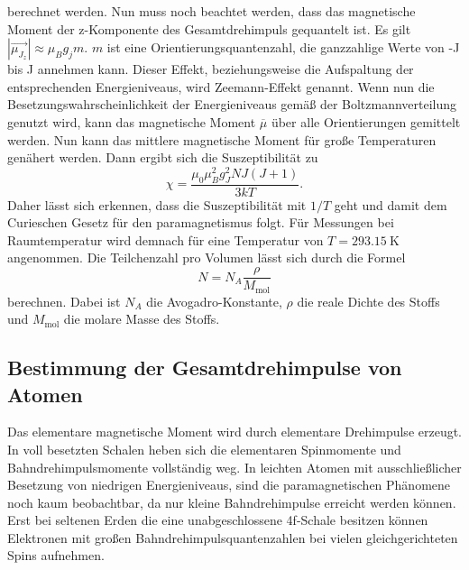 berechnet werden.
Nun muss noch beachtet werden, dass das magnetische Moment der z-Komponente des Gesamtdrehimpuls gequantelt ist.
Es gilt $\left|\vec{\mu_{J_z}}\right| \approx \mu_B g_j m$. $m$ ist eine Orientierungsquantenzahl, die ganzzahlige Werte von -J bis J
annehmen kann. Dieser Effekt, beziehungsweise die Aufspaltung der entsprechenden Energieniveaus, wird Zeemann-Effekt genannt.
Wenn nun die Besetzungswahrscheinlichkeit der Energieniveaus gemäß der Boltzmannverteilung genutzt wird, kann das magnetische Moment $\overline{\mu}$ über
alle Orientierungen gemittelt werden. Nun kann das mittlere magnetische Moment für
große Temperaturen genähert werden. Dann ergibt sich die Suszeptibilität zu 
\begin{equation}
    \chi= \frac{\mu_0\mu_B^2g_J^2NJ(J+1)}{3kT}.
    \label{eq:chi}
\end{equation}
Daher lässt sich erkennen, dass die Suszeptibilität mit $1/T$ geht und damit dem Curieschen Gesetz für den paramagnetismus folgt.
Für Messungen bei Raumtemperatur wird demnach für eine Temperatur von $T=\qty{293.15}{\kelvin}$ angenommen.
Die Teilchenzahl pro Volumen lässt sich durch die Formel
\begin{equation}
    N=N_A\frac{\rho}{M_\text{mol}}
\end{equation}
berechnen. Dabei ist $N_A$ die Avogadro-Konstante, $\rho$ die reale Dichte des Stoffs und $M_\text{mol}$ die molare Masse des Stoffs.
\subsection{Bestimmung der Gesamtdrehimpulse von Atomen }
Das elementare magnetische Moment wird durch elementare Drehimpulse erzeugt. In 
voll besetzten Schalen heben sich die elementaren Spinmomente und Bahndrehimpulsmomente vollständig weg.
In leichten Atomen mit ausschließlicher Besetzung von niedrigen Energieniveaus, sind die paramagnetischen
Phänomene noch kaum beobachtbar, da nur kleine Bahndrehimpulse erreicht werden können.
Erst bei seltenen Erden die eine unabgeschlossene 4f-Schale besitzen können Elektronen mit
großen Bahndrehimpulsquantenzahlen bei vielen gleichgerichteten Spins aufnehmen.

